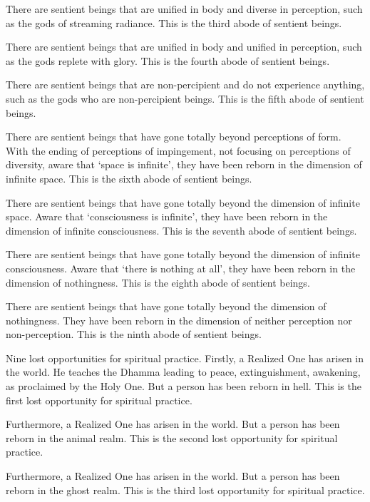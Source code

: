 \documentclass[12pt,openany]{book}%
\begin{document}
There are sentient beings that are unified in body and diverse in perception, such as the gods of streaming radiance. This is the third abode of sentient beings. 

There are sentient beings that are unified in body and unified in perception, such as the gods replete with glory. This is the fourth abode of sentient beings. 

There are sentient beings that are non-percipient and do not experience anything, such as the gods who are non-percipient beings. This is the fifth abode of sentient beings. 

There are sentient beings that have gone totally beyond perceptions of form. With the ending of perceptions of impingement, not focusing on perceptions of diversity, aware that ‘space is infinite’, they have been reborn in the dimension of infinite space. This is the sixth abode of sentient beings. 

There are sentient beings that have gone totally beyond the dimension of infinite space. Aware that ‘consciousness is infinite’, they have been reborn in the dimension of infinite consciousness. This is the seventh abode of sentient beings. 

There are sentient beings that have gone totally beyond the dimension of infinite consciousness. Aware that ‘there is nothing at all’, they have been reborn in the dimension of nothingness. This is the eighth abode of sentient beings. 

There are sentient beings that have gone totally beyond the dimension of nothingness. They have been reborn in the dimension of neither perception nor non-perception. This is the ninth abode of sentient beings. 

Nine lost opportunities for spiritual practice. Firstly, a Realized One has arisen in the world. He teaches the Dhamma leading to peace, extinguishment, awakening, as proclaimed by the Holy One. But a person has been reborn in hell. This is the first lost opportunity for spiritual practice. 

Furthermore, a Realized One has arisen in the world. But a person has been reborn in the animal realm. This is the second lost opportunity for spiritual practice. 

Furthermore, a Realized One has arisen in the world. But a person has been reborn in the ghost realm. This is the third lost opportunity for spiritual practice. 
\end{document}
